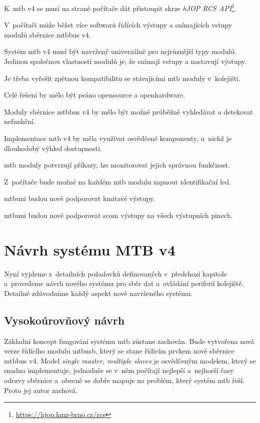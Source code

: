 \begin{compactenum}
\item K~\gls{mtb} v4 se musí na straně počítače dát přistoupit skrze
	\textit{hJOP RCS API}\footnote{\url{https://hjop.kmz-brno.cz/rcs}}.
\item V~počítači může běžet více softwarů řídících výstupy a snímajících vstupy
	modulů sběrnice \gls{mtbbus} v4.
\item Systém \gls{mtb} v4 musí být navržený univerzálně pro nejrůznější typy
	modulů. Jedinou společnou vlastností modulů je, že snímají vstupy a nastavují
	výstupy.
\item Je třeba vyřešit zpětnou kompatibilitu se stávajícími \gls{mtb} moduly
	v~kolejišti.
\item Celé řešení by mělo být psáno opensource a openhardware.
\item Moduly sběrnice \gls{mtbbus} v4 by mělo být možné průběžně vyhledávat
	a detekovat nefunkční.
\item Implementace \gls{mtb} v4 by měla využívat osvědčené komponenty, u~nichž
	je dlouhodobý výhled dostupnosti.
\item \gls{mtb} moduly potvrzují příkazy, lze monitorovat jejich správnou funkčnost.
\item Z~počítače bude možné na každém \gls{mtb} modulu zapnout identifikační \gls{led}.
\item \gls{mtbuni} budou nově podporovat kmitavé výstupy.
\item \gls{mtbuni} budou nově podporovat \gls{scom} výstupy na všech
	výstupních pinech.
\end{compactenum}


\section{Návrh systému MTB v4}

Nyní vyjdeme z~detailních požadavků definovaných v~předchozí kapitole
a~provedeme návrh nového systému pro sběr dat a~ovládání periferií kolejiště.
Detailně zdůvodníme každý aspekt nově navrženého systému.

\subsection{Vysokoúrovňový návrh}

Základní koncept fungování systému \gls{mtb}  zůstane zachován. Bude vytvořena nová verze řídícího modulu
\gls{mtbusb}, který se stane řídicím prvkem nové sběrnice \gls{mtbbus} v4.
Model \textit{single master, multiple slaves} je osvědčeným modelem, který se
snadno implementuje, jednoduše se v~něm počítají nejlepší a~nejhorší časy odezvy
sběrnice a~obecně se dobře mapuje na problém, který systém \gls{mtb} řeší.
Proto jej autor zachová.

